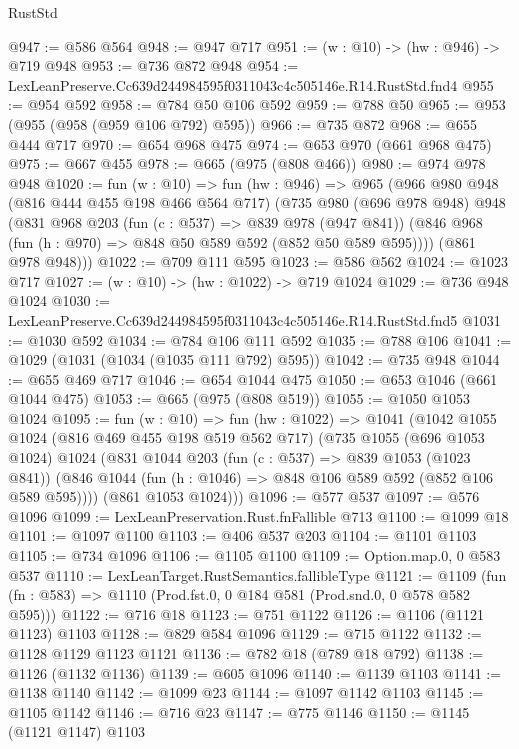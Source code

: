 \begin{lexlean}{RustStd}
\begin{coremodule}
@947 := @586 @564
@948 := @947 @717
@951 := (w : @10) -> (hw : @946) -> @719 @948
@953 := @736 @872 @948
@954 := LexLeanPreserve.Cc639d244984595f0311043c4c505146e.R14.RustStd.fnd4
@955 := @954 @592
@958 := @784 @50 @106 @592
@959 := @788 @50
@965 := @953 (@955 (@958 (@959 @106 @792) @595))
@966 := @735 @872
@968 := @655 @444 @717
@970 := @654 @968 @475
@974 := @653 @970 (@661 @968 @475)
@975 := @667 @455
@978 := @665 (@975 (@808 @466))
@980 := @974 @978 @948
@1020 := fun (w : @10) =>
  fun (hw : @946) =>
  @965
    (@966
      @980
      @948
      (@816 @444 @455 @198 @466 @564 @717)
      (@735
        @980
        (@696 @978 @948)
        @948
        (@831
          @968
          @203
          (fun (c : @537) => @839 @978 (@947 @841))
          (@846 @968 (fun (h : @970) => @848 @50 @589 @592 (@852 @50 @589 @595))))
        (@861 @978 @948)))
@1022 := @709 @111 @595
@1023 := @586 @562
@1024 := @1023 @717
@1027 := (w : @10) -> (hw : @1022) -> @719 @1024
@1029 := @736 @948 @1024
@1030 := LexLeanPreserve.Cc639d244984595f0311043c4c505146e.R14.RustStd.fnd5
@1031 := @1030 @592
@1034 := @784 @106 @111 @592
@1035 := @788 @106
@1041 := @1029 (@1031 (@1034 (@1035 @111 @792) @595))
@1042 := @735 @948
@1044 := @655 @469 @717
@1046 := @654 @1044 @475
@1050 := @653 @1046 (@661 @1044 @475)
@1053 := @665 (@975 (@808 @519))
@1055 := @1050 @1053 @1024
@1095 := fun (w : @10) =>
  fun (hw : @1022) =>
  @1041
    (@1042
      @1055
      @1024
      (@816 @469 @455 @198 @519 @562 @717)
      (@735
        @1055
        (@696 @1053 @1024)
        @1024
        (@831
          @1044
          @203
          (fun (c : @537) => @839 @1053 (@1023 @841))
          (@846 @1044 (fun (h : @1046) => @848 @106 @589 @592 (@852 @106 @589 @595))))
        (@861 @1053 @1024)))
@1096 := @577 @537
@1097 := @576 @1096
@1099 := LexLeanPreservation.Rust.fnFallible @713
@1100 := @1099 @18
@1101 := @1097 @1100
@1103 := @406 @537 @203
@1104 := @1101 @1103
@1105 := @734 @1096
@1106 := @1105 @1100
@1109 := Option.map.{0, 0} @583 @537
@1110 := LexLeanTarget.RustSemantics.fallibleType
@1121 := @1109
    (fun (fn : @583) => @1110 (Prod.fst.{0, 0} @184 @581 (Prod.snd.{0, 0} @578 @582 @595)))
@1122 := @716 @18
@1123 := @751 @1122
@1126 := @1106 (@1121 @1123) @1103
@1128 := @829 @584 @1096
@1129 := @715 @1122
@1132 := @1128 @1129 @1123 @1121
@1136 := @782 @18 (@789 @18 @792)
@1138 := @1126 (@1132 @1136)
@1139 := @605 @1096
@1140 := @1139 @1103
@1141 := @1138 @1140
@1142 := @1099 @23
@1144 := @1097 @1142 @1103
@1145 := @1105 @1142
@1146 := @716 @23
@1147 := @775 @1146
@1150 := @1145 (@1121 @1147) @1103

\end{coremodule}
\end{lexlean}
